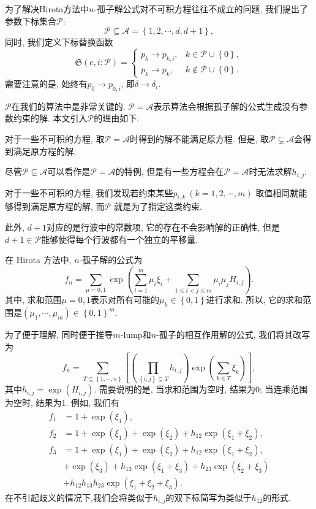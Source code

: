 \documentclass[12pt,a4paper,UTF8]{article}
\numberwithin{equation}{section}
\newcommand{\sbrace}[1]{\left(#1\right)}
\newcommand{\mbrace}[1]{\left[#1\right]}
\newcommand{\bbrace}[1]{\left\{#1\right\}}
\newcommand{\ALLP}{\mathcal{A}}
\newcommand{\PS}{\mathcal{P}}
\newcommand{\SP}{\mathfrak{S}} %
\newcommand{\MLNS}{$m$-lump和$n$-孤子的相互作用解}
\begin{document}
为了解决Hirota方法中$n$-孤子解公式对不可积方程往往不成立的问题, 我们提出了参数下标集合$\PS$: 
\begin{equation}
\PS\subseteq \ALLP=\bbrace{1,2,\cdots,d,d+1} ,
\end{equation}
同时, 我们定义下标替换函数
\begin{equation}
\SP\sbrace{e,i;\PS}=\left\{\begin{array}{ll}
  p_k \to p_{k,i}, & k \in \PS \cup \bbrace{0},\\ 
  p_k \to p_k , & k \not\in\PS \cup \bbrace{0}.
\end{array}\right.
\end{equation}
需要注意的是, 始终有$p_0\to p_{0,i}$, 即$\delta\to \delta_i$. 

$\PS$在我们的算法中是非常关键的. $\PS= \ALLP$表示算法会根据孤子解的公式生成没有参数约束的解. 本文引入$\PS$的理由如下: 
\begin{compactenum}[1. ]
\item 对于一些不可积的方程, 取$\PS= \ALLP$时得到的解不能满足原方程. 但是, 取$\PS\subsetneq  \ALLP$会得到满足原方程的解.
\item 尽管$\PS\subsetneq  \ALLP$可以看作是$\PS= \ALLP$的特例, 但是有一些方程会在$\PS= \ALLP$时无法求解$h_{i,j}$.
\item 对于一些不可积的方程, 我们发现若约束某些$p_{i,k}~(k=1,2,\cdots,m)$ 取值相同就能够得到满足原方程的解, 而$\PS$ 就是为了指定这类约束.
\end{compactenum}

此外, $d+1$对应的是行波中的常数项, 它的存在不会影响解的正确性, 但是$d+1\in \PS$能够使得每个行波都有一个独立的平移量.

在 Hirota 方法中, $n$-孤子解的公式为 
\begin{equation}
f_n=\sum_{\mu=0,1}\exp\sbrace{\sum_{i=1}^m{\mu_i \xi_i}+\sum_{1\le i<j\le m}{\mu_i\mu_jH_{i,j}}}.
\label{soliton-old}
\end{equation}
其中, 求和范围$\mu=0,1$表示对所有可能的$\mu_k\in \bbrace{0,1}$进行求和. 所以, 它的求和范围是$\sbrace{\mu_1,\cdots,\mu_m}\in \bbrace{0,1}^m$.

为了便于理解, 同时便于推导\MLNS{}的公式, 我们将其改写为
\begin{equation}
f_n=\sum_{T\subseteq \bbrace{1,\cdots,n}}\mbrace{\sbrace{\prod_{\bbrace{i,j}\subseteq T}{h_{i,j}}}\exp\sbrace{\sum_{k\in T}{\xi_k}}}, 
\label{soliton-new}
\end{equation}
其中$h_{i,j}=\exp(H_{i,j})$. 需要说明的是, 当求和范围为空时, 结果为0; 当连乘范围为空时, 结果为1. 例如, 我们有
\begin{equation}
\begin{aligned}
f_1&=1+\exp(\xi_1) , \\ 
f_2&=1+\exp(\xi_1)+\exp(\xi_2)+h_{12}\exp(\xi_1+\xi_2) ,\\ 
f_3&=1+\exp(\xi_1)+\exp(\xi_2)+h_{12}\exp(\xi_1+\xi_2) ,\\ 
   &+\exp(\xi_3)+h_{13}\exp(\xi_1+\xi_3)+h_{23}\exp(\xi_2+\xi_3) \\
   &+h_{12}h_{13}h_{23}\exp(\xi_1+\xi_2+\xi_3) .
\end{aligned}
\end{equation}
在不引起歧义的情况下,我们会将类似于$h_{i,j}$的双下标简写为类似于$h_{12}$的形式. 
\end{document}
